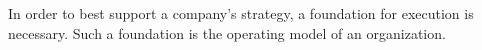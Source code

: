 In order to best support a company's strategy, a foundation for execution is necessary.
Such a foundation is the operating model of an organization.



%
%
%
